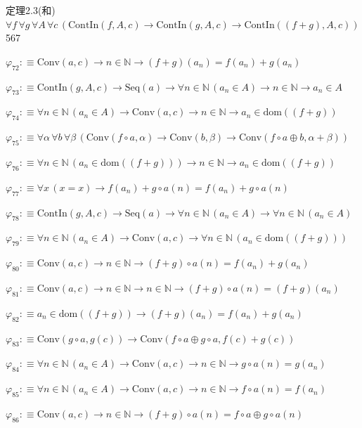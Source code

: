 \begin{fullproof}{定理2.3(和)}{$\forall f\,\forall g\,\forall A\,\forall c\,(\mathrm{ContIn}(f,A,c) \to \mathrm{ContIn}(g,A,c) \to \mathrm{ContIn}((f + g),A,c))$}{567}
\begin{abbrevlist}
\item $\varphi_{72} :\equiv \mathrm{Conv}(a,c) \to n \in \mathbb{N} \to (f + g)(a_{n}) = f(a_{n}) + g(a_{n})$
\item $\varphi_{73} :\equiv \mathrm{ContIn}(g,A,c) \to \mathrm{Seq}(a) \to \forall n \in \mathbb{N}\,(a_{n} \in A) \to n \in \mathbb{N} \to a_{n} \in A$
\item $\varphi_{74} :\equiv \forall n \in \mathbb{N}\,(a_{n} \in A) \to \mathrm{Conv}(a,c) \to n \in \mathbb{N} \to a_{n} \in \mathrm{dom}((f + g))$
\item $\varphi_{75} :\equiv \forall \alpha\,\forall b\,\forall \beta\,(\mathrm{Conv}(f \circ a,\alpha) \to \mathrm{Conv}(b,\beta) \to \mathrm{Conv}(f \circ a \oplus b,\alpha + \beta))$
\item $\varphi_{76} :\equiv \forall n \in \mathbb{N}\,(a_{n} \in \mathrm{dom}((f + g))) \to n \in \mathbb{N} \to a_{n} \in \mathrm{dom}((f + g))$
\item $\varphi_{77} :\equiv \forall x\,(x = x) \to f(a_{n}) + g \circ a(n) = f(a_{n}) + g \circ a(n)$
\item $\varphi_{78} :\equiv \mathrm{ContIn}(g,A,c) \to \mathrm{Seq}(a) \to \forall n \in \mathbb{N}\,(a_{n} \in A) \to \forall n \in \mathbb{N}\,(a_{n} \in A)$
\item $\varphi_{79} :\equiv \forall n \in \mathbb{N}\,(a_{n} \in A) \to \mathrm{Conv}(a,c) \to \forall n \in \mathbb{N}\,(a_{n} \in \mathrm{dom}((f + g)))$
\item $\varphi_{80} :\equiv \mathrm{Conv}(a,c) \to n \in \mathbb{N} \to (f + g) \circ a(n) = f(a_{n}) + g(a_{n})$
\item $\varphi_{81} :\equiv \mathrm{Conv}(a,c) \to n \in \mathbb{N} \to n \in \mathbb{N} \to (f + g) \circ a(n) = (f + g)(a_{n})$
\item $\varphi_{82} :\equiv a_{n} \in \mathrm{dom}((f + g)) \to (f + g)(a_{n}) = f(a_{n}) + g(a_{n})$
\item $\varphi_{83} :\equiv \mathrm{Conv}(g \circ a,g(c)) \to \mathrm{Conv}(f \circ a \oplus g \circ a,f(c) + g(c))$
\item $\varphi_{84} :\equiv \forall n \in \mathbb{N}\,(a_{n} \in A) \to \mathrm{Conv}(a,c) \to n \in \mathbb{N} \to g \circ a(n) = g(a_{n})$
\item $\varphi_{85} :\equiv \forall n \in \mathbb{N}\,(a_{n} \in A) \to \mathrm{Conv}(a,c) \to n \in \mathbb{N} \to f \circ a(n) = f(a_{n})$
\item $\varphi_{86} :\equiv \mathrm{Conv}(a,c) \to n \in \mathbb{N} \to (f + g) \circ a(n) = f \circ a \oplus g \circ a(n)$

\end{abbrevlist}
\end{fullproof}
